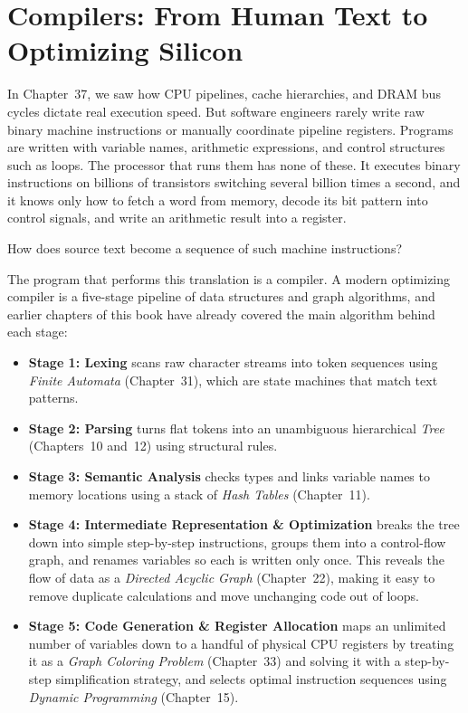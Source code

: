 \chapter{Compilers: From Human Text to Optimizing Silicon}
\label{ch41:compilers}

In Chapter~37, we saw how
CPU pipelines, cache hierarchies, and DRAM bus cycles dictate real execution
speed. But software engineers rarely write raw binary machine instructions or
manually coordinate pipeline registers. Programs are written with
variable names, arithmetic expressions, and control structures such as loops.
The processor that runs them has none of these. It executes binary instructions
on billions of transistors switching several billion times a second, and it
knows only how to fetch a word from memory, decode its bit pattern into control
signals, and write an arithmetic result into a register.

How does source text become a sequence of such machine instructions?

The program that performs this translation is a compiler. A modern optimizing
compiler is a five-stage pipeline of data structures and graph algorithms, and
earlier chapters of this book have already covered the main algorithm behind
each stage:
\begin{itemize}
  \item \textbf{Stage 1: Lexing} scans raw character streams into token
  sequences using \emph{Finite Automata} (Chapter~31), which are state machines that match text patterns.
  \item \textbf{Stage 2: Parsing} turns flat tokens into an unambiguous
  hierarchical \emph{Tree} (Chapters~10
  and~12) using structural rules.
  \item \textbf{Stage 3: Semantic Analysis} checks types and links variable
  names to memory locations using a stack of \emph{Hash Tables} (Chapter~11).
  \item \textbf{Stage 4: Intermediate Representation \& Optimization} breaks the
  tree down into simple step-by-step instructions, groups them into a control-flow graph, and renames variables so each is written only once. This reveals the flow of data as a \emph{Directed Acyclic Graph}
  (Chapter~22), making it easy to remove duplicate calculations and move unchanging code out of loops.
  \item \textbf{Stage 5: Code Generation \& Register Allocation} maps an
  unlimited number of variables down to a handful of physical CPU
  registers by treating it as a \emph{Graph Coloring Problem}
  (Chapter~33) and solving it with a step-by-step simplification strategy,
  and selects optimal instruction sequences using \emph{Dynamic Programming}
  (Chapter~15).
\end{itemize}

